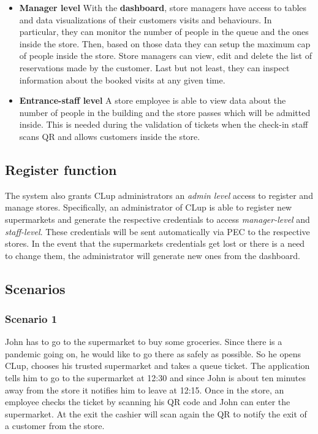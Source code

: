 \begin{itemize}
	\item \textbf{Manager level}\newline
	With the \textbf{dashboard}, store managers have access to tables and data visualizations of their customers visits and behaviours. In particular, they can monitor the number of people in the queue and the ones inside the store. Then, based on those data they can setup the maximum cap of people inside the store.\newline
	Store managers can view, edit and delete the list of reservations made by the customer.\newline
	Last but not least, they can inspect information about the booked visits at any given time.

	\item \textbf{Entrance-staff level}\newline
	A store employee is able to view data about the number of people in the building and the store passes which will be admitted inside.
	This is needed during the validation of tickets when the check-in staff scans QR and allows customers inside the store.
\end{itemize}

\subsection{Register function}
The system also grants CLup administrators an \textit{admin level} access to register and manage stores.
Specifically, an administrator of CLup is able to register new supermarkets and generate the respective credentials to access \textit{manager-level} and \textit{staff-level}. These credentials will be sent automatically via PEC to the respective stores.\newline
In the event that the supermarkets credentials get lost or there is a need to change them, the administrator will generate new ones from the dashboard.

\clearpage


\subsection{Scenarios}

\subsubsection{Scenario 1}\label{sc:first}
John has to go to the supermarket to buy some groceries. Since there is a pandemic going on, he would like to go there as safely as possible.\newline
So he opens CLup, chooses his trusted supermarket and takes a queue ticket. The application tells him to go to the supermarket at 12:30 and since John is about ten minutes away from the store it notifies him to leave at 12:15. Once in the store, an employee checks the ticket by scanning his QR code and John can enter the supermarket.
At the exit the cashier will scan again the QR to notify the exit of a customer from the store.

